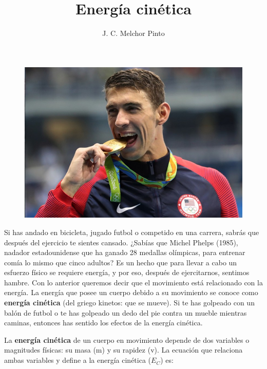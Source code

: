 \documentclass[12pt]{guia}
\title{Energía cinética}
\author{J. C. Melchor Pinto}
\begin{document}
\pagestyle{headandfoot}
\addpoints
\INFO
\begin{opening}{
        \begin{minipage}{0.35\textwidth}
            \begin{figure}[H]
                \includegraphics[width=\linewidth]{../images/michael_phelps.jpg}
            \end{figure}
        \end{minipage}\hfill
        \begin{minipage}{0.6\textwidth}
            Si has andado en bicicleta, jugado futbol o competido en una carrera, sabrás
            que después del ejercicio te sientes cansado. ¿Sabías que Michel Phelps
            (1985), nadador estadounidense que ha ganado 28 medallas olímpicas, para
            entrenar comía lo mismo que cinco adultos? Es un hecho que para llevar a
            cabo un esfuerzo físico se requiere energía, y por eso, después de ejercitarnos, sentimos hambre.
            Con lo anterior queremos decir que el movimiento
            está relacionado con la energía. La energía que posee un cuerpo debido a
            su movimiento se conoce como \textbf{energía cinética} (del griego kinetos: que se
            mueve). Si te has golpeado con un balón de futbol o te has golpeado un dedo
            del pie contra un mueble mientras caminas, entonces has sentido los efectos de
            la energía cinética.\\
        \end{minipage}
        La \textbf{energ\'ia cin\'etica} de un cuerpo en movimiento depende de
        dos variables o magnitudes f\'isicas: su masa (m) y su rapidez (v). La ecuaci\'on
        que relaciona ambas variables y define a la energ\'ia cin\'etica ($E_C$) es:

}
\end{opening}
\end{document}
